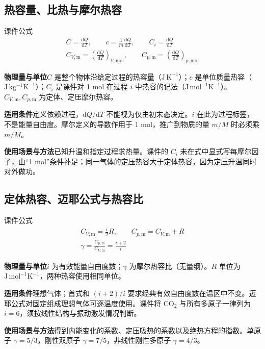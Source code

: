 \documentclass[UTF8,fontset=none,zihao=-4,a4paper]{ctexart}
\newcommand{\explain}[3]{\par\noindent\textbf{物理量与单位}\quad #1\par
\noindent\textbf{适用条件}\quad #2\par
\noindent\textbf{使用场景与方法}\quad #3\par}
\begin{document}
\par\noindent\begin{minipage}{\linewidth}
\subsection{热容量、比热与摩尔热容}
\begin{infobox}[breakable=false]{课件公式}
\begin{gather*}C=\frac{\mathrm dQ}{\mathrm dT},\qquad c=\frac1m\frac{\mathrm dQ}{\mathrm dT},\qquad C_i=\frac{\mathrm dQ}{\mathrm dT}\\C_{V,\mathrm m}=\left(\frac{\mathrm dQ}{\mathrm dT}\right)_{V,\mathrm{mol}},\qquad C_{p,\mathrm m}=\left(\frac{\mathrm dQ}{\mathrm dT}\right)_{p,\mathrm{mol}}\end{gather*}
\end{infobox}
\end{minipage}\par
\explain{$C$ 是整个物体沿给定过程的热容量（$\mathrm{J\,K^{-1}}$）；$c$ 是单位质量热容（$\mathrm{J\,kg^{-1}K^{-1}}$）；$C_i$ 是课件对 1 mol 在过程 $i$ 中热容的记法（$\mathrm{J\,mol^{-1}K^{-1}}$）。$C_{V,\mathrm m},C_{p,\mathrm m}$ 为定体、定压摩尔热容。}{定义依赖过程，$\mathrm dQ/\mathrm dT$ 不能视为仅由初末态决定。$i$ 在此为过程标签，不是能量自由度。摩尔定义的导数作用于 1 mol，推广到物质的量 $m/M$ 时必须乘 $m/M$。}{已知升温和指定过程求热量。课件的 $C_i$ 未在式中显式写每摩尔因子，由“1 mol”条件补足；同一气体的定压热容大于定体热容，因为定压升温同时对外做功。}


\par\noindent\begin{minipage}{\linewidth}
\subsection{定体热容、迈耶公式与热容比}
\begin{infobox}[breakable=false]{课件公式}
\begin{gather*}C_{V,\mathrm m}=\frac i2R,\qquad C_{p,\mathrm m}=C_{V,\mathrm m}+R\\\gamma=\frac{C_{p,\mathrm m}}{C_{V,\mathrm m}}=\frac{i+2}{i}\end{gather*}
\end{infobox}
\end{minipage}\par
\explain{$i$ 为有效能量自由度数；$\gamma$ 为摩尔热容比（无量纲）。$R$ 单位为 $\mathrm{J\,mol^{-1}K^{-1}}$，两种热容使用相同单位。}{理想气体；首式和 $(i+2)/i$ 要求经典有效自由度数在温区中不变。迈耶公式对固定组成理想气体可逐温度使用。课件将 CO$_2$ 与所有多原子一律列为 $i=6$，须按线性结构与振动激发情况判断。}{得到内能变化的系数、定压吸热的系数以及绝热方程的指数。单原子 $\gamma=5/3$，刚性双原子 $\gamma=7/5$，非线性刚性多原子 $\gamma=4/3$。}
\end{document}
